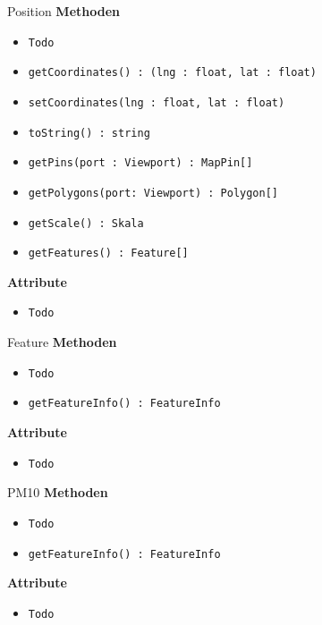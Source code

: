     \begin{Class}{Position}
        \textbf{Methoden}
        \begin{itemize}
            \item \texttt{Todo}
            \item \texttt{getCoordinates() : (lng : float, lat : float)}
            \item \texttt{setCoordinates(lng : float, lat : float)}
            \item \texttt{toString() : string}
            \item \texttt{getPins(port : Viewport) : MapPin[]}
            \item \texttt{getPolygons(port: Viewport) : Polygon[]}
            \item \texttt{getScale() : Skala}
            \item \texttt{getFeatures() : Feature[]}
        \end{itemize}
        
        \textbf{Attribute}
        \begin{itemize}
            \item \texttt{Todo}
        \end{itemize}
    \end{Class}

    \begin{Class}{Feature}
        \textbf{Methoden}
        \begin{itemize}
            \item \texttt{Todo}
            \item \texttt{getFeatureInfo() : FeatureInfo}
        \end{itemize}
        
        \textbf{Attribute}
        \begin{itemize}
            \item \texttt{Todo}
        \end{itemize}
    \end{Class}

    \begin{Class}{PM10}
        \textbf{Methoden}
        \begin{itemize}
            \item \texttt{Todo}
            \item \texttt{getFeatureInfo() : FeatureInfo}
        \end{itemize}
        
        \textbf{Attribute}
        \begin{itemize}
            \item \texttt{Todo}
        \end{itemize}
    \end{Class}

